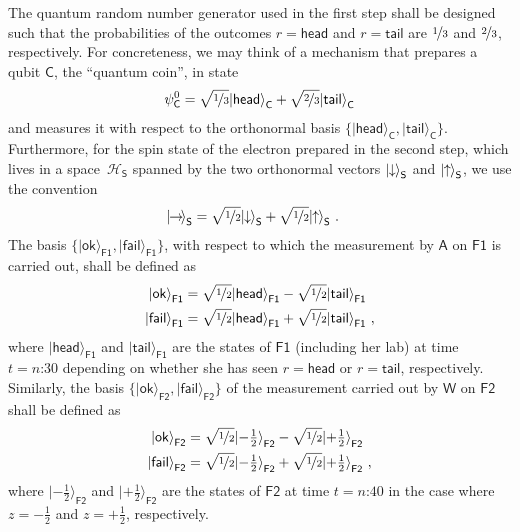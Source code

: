 \documentclass{article}
\theoremstyle{plain}
\theoremstyle{definition}
\newcommand*{\cH}{\mathcal{H}}
\newcommand*{\ket}[1]{{| #1 \rangle}}
\newcommand*{\Friendone}{\mathsf{F1}}
\newcommand*{\Friendtwo}{\mathsf{F2}}
\newcommand*{\Assistant}{\mathsf{A}}
\newcommand*{\Wigner}{\mathsf{W}}
\newcommand*{\Spin}{\mathsf{S}}
\newcommand*{\Coin}{\mathsf{C}}
\newcommand*{\spinup}{\ket{{\hspace{-0.1ex}\uparrow\hspace{-0.1ex}}}}
\newcommand*{\spindown}{\ket{{\hspace{-0.1ex}\downarrow\hspace{-0.1ex}}}}
\newcommand*{\spinright}{\ket{{\hspace{-0.2ex}\rightarrow\hspace{-0.4ex}}}}
\newcommand*{\sminus}{{\textstyle - \frac{1}{2}}}
\newcommand*{\splus}{{\textstyle + \frac{1}{2}}}
\newcommand*{\ok}{\mathsf{ok}}
\newcommand*{\fail}{\mathsf{fail}}
\newcommand*{\head}{\mathsf{head}}
\newcommand*{\tail}{\mathsf{tail}}
\begin{document}
The quantum random number generator used in the first step shall be designed such that the probabilities of the outcomes $r=\head$ and $r=\tail$ are $\nicefrac{1}{3}$ and $\nicefrac{2}{3}$, respectively. For concreteness, we may think of a mechanism that prepares a qubit $\Coin$, the ``quantum coin'', in state 
\begin{align}  \label{eq_Qinitialstate}
  \psi^0_{\Coin} = \sqrt{\nicefrac{1}{3}} \ket{\head}_\Coin + \sqrt{\nicefrac{2}{3}} \ket{\tail}_\Coin
\end{align}
 and measures it with respect to the orthonormal basis $\{\ket{\head}_\Coin, \ket{\tail}_\Coin\}$. Furthermore, for the spin state of the electron prepared in the second step, which lives in a space~$\cH_{\Spin}$ spanned by the two orthonormal vectors $\spindown_{\Spin}$ and $\spinup_{\Spin}$, we use the convention
\begin{align*}
  \spinright_\Spin & =   \sqrt{\nicefrac{1}{2}} \spindown_\Spin + \sqrt{\nicefrac{1}{2}} \spinup_\Spin \ .
\end{align*}
The basis $\{\ket{\ok}_{\Friendone}, \ket{\fail}_{\Friendone}\}$, with respect to which the measurement by $\Assistant$ on $\Friendone$ is carried out, shall be defined as
\begin{align*}
  \ket{\ok}_{\Friendone} & = \sqrt{\nicefrac{1}{2}} \ket{\head}_{\Friendone} -  \sqrt{\nicefrac{1}{2}} \ket{\tail}_{\Friendone} \\
  \ket{\fail}_{\Friendone} & = \sqrt{\nicefrac{1}{2}} \ket{\head}_{\Friendone} + \sqrt{\nicefrac{1}{2}} \ket{\tail}_{\Friendone}  \ ,
\end{align*}
where $\ket{\head}_{\Friendone}$ and $\ket{\tail}_{\Friendone}$ are the states of $\Friendone$ (including her lab) at time $t = \text{$n$:30}$ depending on whether she has seen $r=\head$ or $r=\tail$, respectively. Similarly, the basis $\{\ket{\ok}_{\Friendtwo}, \ket{\fail}_{\Friendtwo}\}$ of the measurement carried out by $\Wigner$ on $\Friendtwo$ shall be defined as
\begin{align*}
    \ket{\ok}_{\Friendtwo} & = \sqrt{\nicefrac{1}{2}} \ket{\sminus}_{\Friendtwo} - \sqrt{\nicefrac{1}{2}} \ket{\splus}_{\Friendtwo} \\
  \ket{\fail}_{\Friendtwo} & = \sqrt{\nicefrac{1}{2}} \ket{\sminus}_{\Friendtwo} +  \sqrt{\nicefrac{1}{2}} \ket{\splus}_{\Friendtwo}  \ ,
\end{align*}
where $\ket{\sminus}_{\Friendtwo}$ and $\ket{\splus}_{\Friendtwo}$ are the states of $\Friendtwo$  at time $t = \text{$n$:40}$ in the case where $z = \sminus$ and $z = \splus$, respectively. 
\end{document}
